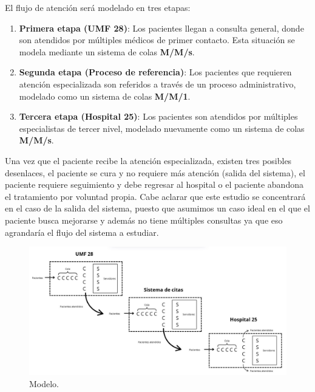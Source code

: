 \documentclass[10pt]{article}
\begin{document}
    El flujo de atención será modelado en tres etapas:

    \begin{enumerate}
        \item \textbf{Primera etapa (UMF 28)}: Los pacientes llegan a consulta general, donde son atendidos por múltiples médicos de primer contacto. Esta situación se modela mediante un sistema de colas \textbf{M/M/s}.
        
        \item \textbf{Segunda etapa (Proceso de referencia)}: Los pacientes que requieren atención especializada son referidos a través de un proceso administrativo, modelado como un sistema de colas \textbf{M/M/1}.
        
        \item \textbf{Tercera etapa (Hospital 25)}: Los pacientes son atendidos por múltiples especialistas de tercer nivel, modelado nuevamente como un sistema de colas \textbf{M/M/s}.
    \end{enumerate}

    Una vez que el paciente recibe la atención especializada, existen tres posibles desenlaces, el paciente se cura y no requiere más atención (salida del sistema), el paciente requiere seguimiento y debe regresar al hospital o el paciente abandona el tratamiento por voluntad propia. Cabe aclarar que este estudio se concentrará en el caso de la salida del sistema, puesto que asumimos un caso ideal en el que el paciente busca mejorarse y además no tiene múltiples consultas ya que eso agrandaría el flujo del sistema a estudiar.
    
    \begin{figure}[h]
    	\centering
    	\includegraphics[width=130mm]{./images/sistema.jpg}
    	\caption{Modelo.}
    \end{figure}
    
    \newpage
\end{document}
